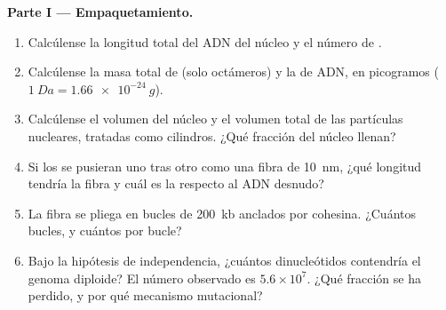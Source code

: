\begin{problem}
\medskip
\noindent\textbf{Parte I --- Empaquetamiento.}
\begin{enumerate}
  \item Calcúlense la longitud total del ADN del núcleo y el número de
        .
  \item Calcúlense la masa total de  (solo octámeros) y la de
        ADN, en picogramos ($\qty{1}{Da} = \qty{1.66e-24}{g}$).
  \item Calcúlense el volumen del núcleo y el volumen total de las
        partículas nucleares, tratadas como cilindros. ¿Qué fracción del
        núcleo llenan?
  \item Si los  se pusieran uno tras otro como una fibra de
        \qty{10}{nm}, ¿qué longitud tendría la fibra y cuál es la  respecto al ADN desnudo?
  \item La fibra se pliega en bucles de \qty{200}{kb} anclados por
        cohesina. ¿Cuántos bucles, y cuántos  por bucle?
  \item Bajo la hipótesis de independencia, ¿cuántos dinucleótidos 
        contendría el genoma diploide? El número observado es
        $5.6\times 10^{7}$. ¿Qué fracción se ha perdido, y por qué
        mecanismo mutacional?
\end{enumerate}


\end{problem}
